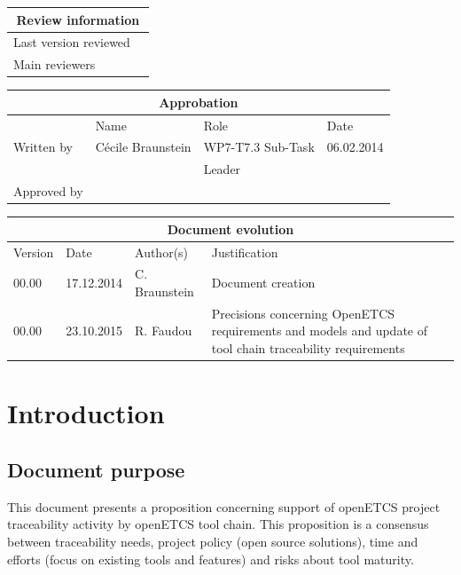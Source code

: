 \documentclass[11pt]{template/openetcs_report}
\begin{document}
\begin{tabular}{|p{4.4cm}|p{8.7cm}|}
\hline
\multicolumn{2}{|c|}{Review information} \\
\hline
Last version reviewed &  \\
\hline
Main reviewers &  \\
\hline
\end{tabular}

\begin{tabular}{|p{2.2cm}|p{4cm}|p{4cm}|p{2cm}|}
\hline
\multicolumn{4}{|c|}{Approbation} \\
\hline
  &  Name & Role & Date   \\
\hline  
Written by    &  Cécile Braunstein & WP7-T7.3 Sub-Task  & 06.02.2014 \\
&  & Leader&\\
\hline
Approved by &  &   &  \\
\hline
\end{tabular}

\begin{tabular}{|p{2.2cm}|p{2cm}|p{3cm}|p{5cm}|}
\hline
\multicolumn{4}{|c|}{Document evolution} \\
\hline
Version &  Date & Author(s) & Justification  \\
\hline  
00.00 & 17.12.2014 & C. Braunstein  &  Document creation  \\
\hline  
00.00 & 23.10.2015 & R. Faudou  &  Precisions concerning OpenETCS requirements and models and update of tool chain traceability requirements  \\


\hline  
\end{tabular}
\newpage
\mainmatter
\chapter{Introduction}
\section{Document purpose}
This document presents a proposition concerning support of openETCS project traceability activity by openETCS tool chain. This proposition is a consensus between traceability needs, project policy (open source solutions), time and efforts (focus on existing tools and features) and risks about tool maturity.
\end{document}
